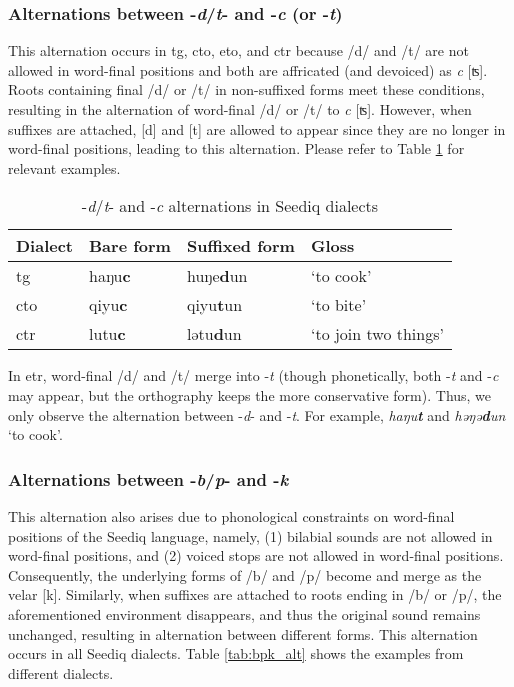 \subsubsection{Alternations between -\textit{d}/\textit{t}- and -\textit{c} (or -\textit{t})} \label{sec:dtc_alt}

This alternation occurs in \acl{tg}, \acl{cto}, \acl{eto}, and \acl{ctr} because /d/ and /t/ are not allowed in word-final positions and both are affricated (and devoiced) as \textit{c} [ʦ]. Roots containing final /d/ or /t/ in non-suffixed forms meet these conditions, resulting in the alternation of word-final /d/ or /t/ to \textit{c} [ʦ]. However, when suffixes are attached, [d] and [t] are allowed to appear since they are no longer in word-final positions, leading to this alternation. Please refer to Table \ref{tab:dtc_alt} for relevant examples.

\begin{table}[!htbp]
\centering
\caption{-\textit{d}/\textit{t}- and -\textit{c} alternations in Seediq dialects}
\label{tab:dtc_alt}
\begin{tabular}{llll}
\hline
Dialect   & Bare form & Suffixed form & Gloss                \\ \hline
\acl{tg}  & haŋu\textbf{c}     & huŋe\textbf{d}un       & `to cook'            \\
\acl{cto} & qiyu\textbf{c}     & qiyu\textbf{t}un       & `to bite'            \\
\acl{ctr} & lutu\textbf{c}     & lətu\textbf{d}un       & `to join two things' \\ \hline
\end{tabular}
\end{table}

In \acl{etr}, word-final /d/ and /t/ merge into -\textit{t} (though phonetically, both -\textit{t} and -\textit{c} may appear, but the orthography keeps the more conservative form). Thus, we only observe the alternation between -\textit{d}- and -\textit{t}. For example, \textit{haŋu\textbf{t}} and \textit{həŋə\textbf{d}un} `to cook'.

\subsubsection{Alternations between -\textit{b}/\textit{p}- and -\textit{k}}

This alternation also arises due to phonological constraints on word-final positions of the Seediq language, namely, (1) bilabial sounds are not allowed in word-final positions, and (2) voiced stops are not allowed in word-final positions. Consequently, the underlying forms of /b/ and /p/ become and merge as the velar [k]. Similarly, when suffixes are attached to roots ending in /b/ or /p/, the aforementioned environment disappears, and thus the original sound remains unchanged, resulting in alternation between different forms. This alternation occurs in all Seediq dialects. Table \ref{tab:bpk_alt} shows the examples from different dialects. 

